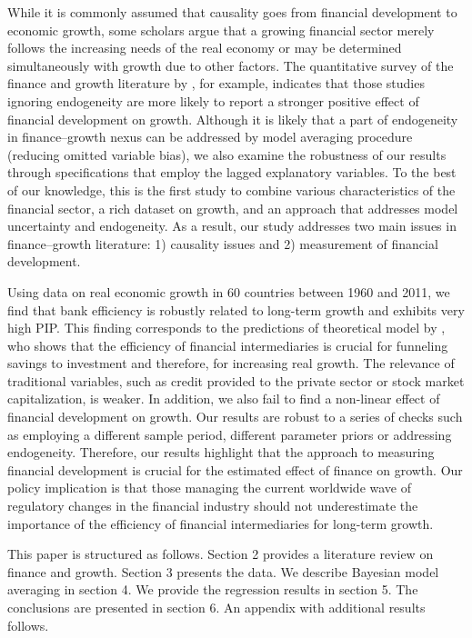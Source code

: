 While it is commonly assumed that causality goes from financial development to economic growth, some scholars argue that a growing financial sector merely follows the increasing needs of the real economy or may be determined simultaneously with growth due to other factors. The quantitative survey of the finance and growth literature by \citet{Valickovaetal2014}, for example, indicates that those studies ignoring endogeneity are more likely to report a stronger positive effect of financial development on growth. Although it is likely that a part of endogeneity in finance--growth nexus can be addressed by model averaging procedure (reducing omitted variable bias), we also examine the robustness of our results through specifications that employ the lagged explanatory variables. To the best of our knowledge, this is the first study to combine various characteristics of the financial sector, a rich dataset on growth, and an approach that addresses model uncertainty and endogeneity. As a result, our study addresses two main issues in finance--growth literature: 1) causality issues and 2) measurement of financial development.

Using data on real economic growth in 60 countries between 1960 and 2011, we find that bank efficiency is robustly related to long-term growth and exhibits very high PIP. This finding corresponds to the predictions of theoretical model by \citet{Pagano1993}, who shows that the efficiency of financial intermediaries is crucial for funneling savings to investment and therefore, for increasing real growth. The relevance of traditional variables, such as credit provided to the private sector or stock market capitalization, is weaker. In addition, we also fail to find a non-linear effect of financial development on growth.  Our results are robust to a series of checks such as employing a different sample period, different parameter priors or addressing endogeneity. Therefore, our results highlight that the approach to measuring financial development is crucial for the estimated effect of finance on growth. Our policy implication is that those managing the current worldwide wave of regulatory changes in the financial industry should not underestimate the importance of the efficiency of financial intermediaries for long-term growth.

This paper is structured as follows. Section 2 provides a literature review on finance and growth. Section 3 presents the data. We describe Bayesian model averaging in section 4. We provide the regression results in section 5. The conclusions are presented in section 6. An appendix with additional results follows. 






